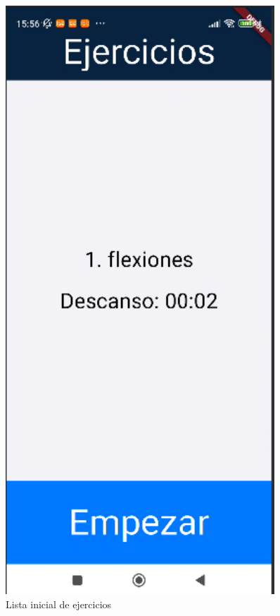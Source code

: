 \begin{figure}[H]
   \centering
   \begin{minipage}{0.4\textwidth}
      \centering
      \includegraphics[width=0.9\textwidth]{pantallas/listaIni.png}
      \caption{Lista inicial de ejercicios}
      \label{fig:listaIni}

\end{minipage}
\end{figure}
